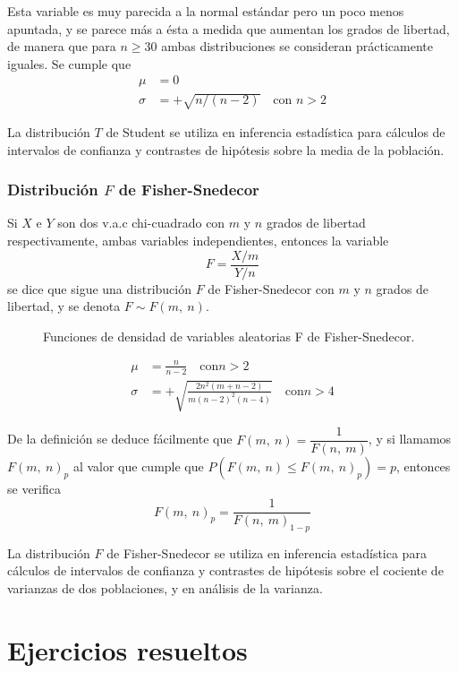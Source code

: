 Esta variable es muy parecida a la normal estándar pero un poco
menos apuntada, y se parece más a ésta a medida que aumentan los
grados de libertad, de manera que para $n\geq 30$ ambas
distribuciones se consideran prácticamente iguales. Se cumple que
\begin{align*}
\mu &= 0\\
\sigma &=+\sqrt{n/(n-2)}\quad \textrm{con } n>2
\end{align*}

La distribución $T$ de Student se utiliza en inferencia estadística para cálculos de intervalos de confianza y contrastes de hipótesis sobre la media de la población.

\subsubsection{Distribución $F$ de Fisher-Snedecor}
Si $X$ e $Y$ son dos v.a.c chi-cuadrado con $m$ y $n$ grados de libertad respectivamente, ambas variables
independientes, entonces la variable
\[
F=\frac{X/m}{Y/n}
\]
se dice que sigue una distribución $F$ de Fisher-Snedecor con $m$ y
$n$ grados de libertad, y se denota $F\sim F(m,\ n)$.

\begin{figure}[h!]
\centering
\scalebox{0.8}{} 
\caption{Funciones de densidad de variables aleatorias F de Fisher-Snedecor.}\label{g:ffisher}
\end{figure}

\begin{align*}
\mu &= \frac{n}{n-2}\quad \textrm{con
} n>2\\
\sigma &=+\sqrt{\frac{2n^2(m+n-2)}{m(n-2)^2(n-4)}}\quad \textrm{con
} n>4
\end{align*}

De la definición se deduce fácilmente que $F(m,\ n)=\dfrac{1}{F(n,\
m)}$, y si llamamos $F(m,\ n)_p$ al valor que cumple que $P(F(m,\
n)\leq F(m,\ n)_p)=p$, entonces se verifica
\[
F(m,\ n)_p = \frac{1}{F(n,\ m)_{1-p}}
\]

La distribución $F$ de Fisher-Snedecor se utiliza en inferencia estadística para cálculos de intervalos
de confianza y contrastes de hipótesis sobre el cociente de varianzas de dos poblaciones, y en análisis de la varianza.


\clearpage
\newpage


\section{Ejercicios resueltos}

